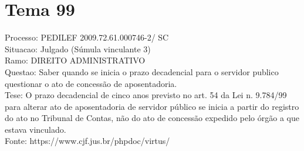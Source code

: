\documentclass[12pt]{article}
\begin{document}
\section*{Tema 99}
Processo: PEDILEF 2009.72.61.000746-2/ SC\\
Situacao: Julgado (Súmula vinculante 3)\\
Ramo: DIREITO ADMINISTRATIVO\\
Questao: Saber quando se inicia o prazo decadencial para o servidor publico questionar o ato de concessão de aposentadoria.\\
Tese: O prazo decadencial de cinco anos previsto no art. 54 da Lei n. 9.784/99 para alterar ato de aposentadoria de servidor público se inicia a partir do registro do ato no Tribunal de Contas, não do ato de concessão expedido pelo órgão a que estava vinculado.\\
Fonte: https://www.cjf.jus.br/phpdoc/virtus/
\end{document}
